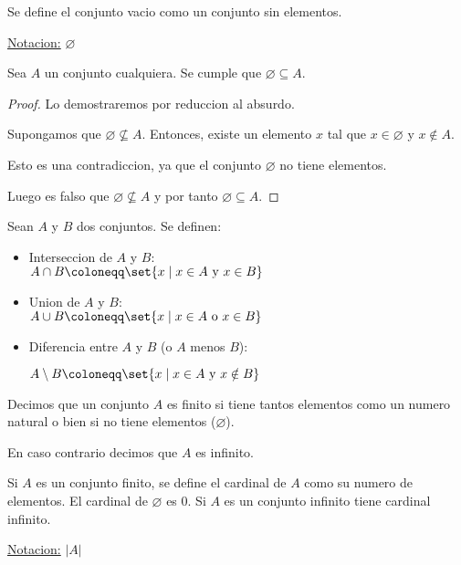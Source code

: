 \begin{definition}
	Se define el conjunto vacio como un conjunto sin elementos.

	\underline{Notacion:} \(\varnothing\)
\end{definition}

\begin{proposition}
	Sea \(A \) un conjunto cualquiera. Se cumple que \(\varnothing \subseteq  A \).
\end{proposition}
\begin{proof}
	Lo demostraremos por reduccion al absurdo.

	Supongamos que \(\varnothing \not\subseteq A \). Entonces, existe un elemento \(x \) tal que \(x \in \varnothing\) y \(x \notin A \).

	Esto es una contradiccion, ya que el conjunto \(\varnothing \) no tiene elementos.

	Luego es falso que \(\varnothing \not\subseteq A \) y por tanto \(\varnothing \subseteq A \).
\end{proof}

\begin{definition}
	Sean \(A \) y \(B \) dos conjuntos. Se definen:
	\begin{itemize}
		\item Interseccion de \(A \) y \(B \): \\
		      \(A \cap B \coloneqq \set{x \mid x \in A \text{ y } x \in B}\)
		\item Union de \(A \) y \(B \): \\
		      \(A \cup B \coloneqq \set{x \mid x \in A \text{ o } x \in B}\)
		\item Diferencia entre \(A \) y \(B \) (o \(A \) menos \(B \)):

		      \(A \setminus B \coloneqq \set{x \mid x \in A \text{ y } x \notin B }\)

	\end{itemize}
\end{definition}

\begin{definition}
	Decimos que un conjunto \(A \) es finito si tiene tantos elementos como un numero natural o bien si no tiene elementos (\(\varnothing\)).

	En caso contrario decimos que \(A \) es infinito.
\end{definition}

\begin{definition}
	Si \(A \) es un conjunto finito, se define el cardinal de \(A \) como su numero de elementos. El cardinal de \(\varnothing \) es 0. Si \(A \) es un conjunto infinito tiene cardinal infinito.

	\underline{Notacion:} \(|A|\)
\end{definition}


